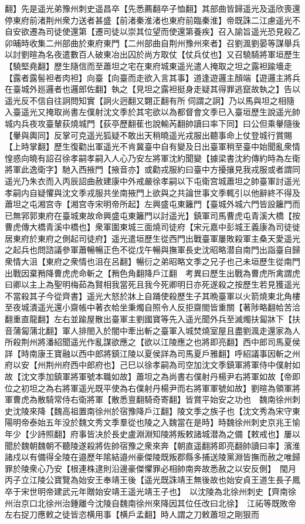 翻】先是遥光弟豫州刺史遥昌卒【先悉薦翻卒子恤翻】其部曲皆歸遥光及遥欣喪還停東府前渚荆州衆力送者甚盛【前渚秦淮渚也東府前臨秦淮】帝既誅二江慮遥光不自安欲遷為司徒使還第【遷司徒以崇其位望而使還第養疾】召入諭旨遥光恐見殺乙卯晡時收集二州部曲於東府東門【二州部曲自荆州豫州來者】召劉渢劉晏等謀舉兵以討劉暄為名夜遣數百人破東冶出囚於尚方取仗【仗兵仗也】又召驍騎將軍垣歷生【驍堅堯翻】歷生隨信而至蕭坦之宅在東府城東遥光遣人掩取之坦之露袒踰墻走【露者露髻袒者肉袒】向臺【向臺而走欲入言其事】道逢遊邏主顏端【遊邏主將兵在臺城外廵邏者也邏郎佐翻】執之【見坦之露袒挺身走疑其得罪逃竄故執之】告以遥光反不信自往詗問知實【詗火迥翻又翾正翻有所伺謂之詗】乃以馬與坦之相隨入臺遥光又掩取尚書左僕射沈文季於其宅欲以為都督會文季已入臺垣歷生說遥光帥城内兵夜攻臺輦荻燒城門【荻亭歷翻萑也說輸芮翻帥讀曰率下同】曰公但乘轝隨後【轝與輿同】反掌可克遥光狐疑不敢出天稍曉遥光戎服出聽事命上仗登城行賞賜【上時掌翻】歷生復勸出軍遥光不肯冀臺中自有變及日出臺軍稍至臺中始聞亂衆情惶惑向曉有詔召徐孝嗣孝嗣入人心乃安左將軍沈約聞變【據梁書沈約傳約時為左衛將軍此逸衛字】馳入西掖門【掖音亦】或勸戎服約曰臺中方擾攘見我戎服或者謂同遥光乃朱衣而入丙辰詔曲赦建康中外戒嚴徐孝嗣以下屯衛宫城蕭坦之帥臺軍討遥光孝嗣内自疑懼與沈文季戎服共坐南掖門上欲與之共論世事文季輒引以他辭終不得及蕭坦之屯湘宫寺【湘宫寺宋明帝所起】左興盛屯東籬門【臺城外城六門皆設籬門而已無郛郭東府在臺城東故命興盛屯東籬門以討遥光】鎮軍司馬曹虎屯青溪大橋【按曹虎傳大橋青溪中橋也】衆軍圍東城三面燒司徒府【宋元嘉中彭城王義康為司徒徙居東府於東府之側起司徒府】遥光遣垣歷生從西門出戰臺軍屢敗殺軍主桑天愛遥光之起兵也問諮議參軍蕭暢暢正色不從戊午暢與撫軍長史沈昭略潜自南門出詣臺自歸衆情大沮【東府之衆情也沮在呂翻】暢衍之弟昭略文季之兄子也己未垣歷生從南門出戰因棄矟降曹虎虎命斬之【矟色角翻降戶江翻　考異曰歷生出戰為曹虎所禽謂虎曰卿以主上為聖明梅茹為賢相我當死且我今死卿明日亦死遂殺之按歷生若見獲遥光不當殺其子今從齊書】遥光大怒於牀上自踊使殺歷生子其晩臺軍以火箭燒東北角樓至夜城潰遥光還小齋帳中著衣帢坐秉燭自照令人反拒齋閤皆重關【著陟略翻帢苦洽翻重直龍翻】左右並踰屋散出臺軍主劉國寶等先入遥光聞外兵至滅燭扶匐牀下【扶音蒲匐蒲北翻】軍人排閤入於闇中牽出斬之臺軍入城焚燒室屋且盡劉渢走還家為人所殺荆州將潘紹聞遥光作亂謀欲應之【欲以江陵應之也將即亮翻】西中郎司馬夏侯詳【時南康王寶融以西中郎將鎮江陵以夏侯詳為司馬夏戶雅翻】呼紹議事因斬之州府以安【州荆州府西中郎府也】己巳以徐孝嗣為司空加沈文季鎮軍將軍侍中僕射如故【沈文季加鎮軍將軍號本職如故】蕭坦之為尚書右僕射丹楊尹右將軍如故【帝即位之初坦之為右將軍遥光既平使為右僕射丹楊尹而右將軍軍號如故】劉暄為領軍將軍曹虎為散騎常侍右衛將軍【散悉亶翻騎奇寄翻】皆賞平始安之功也　魏南徐州刺史沈陵來降【魏高祖置南徐州於宿豫降戶江翻】陵文季之族子也【沈文秀為宋守東陽明帝泰始五年没於魏文秀文季羣從也陵之入魏當在是時】時魏徐州刺史京兆王愉年少【少詩照翻】府事皆决於長史盧淵淵知陵將叛敕諸城潜為之備【敕戒也】屢以聞於魏朝魏朝不聽陵遂殺將佐帥宿豫之衆來奔【朝直遥翻將即亮翻帥讀曰率】濱淮諸戍以有備得全陵在邉歷年隂結邉州豪傑陵既叛郡縣多捕送陵黨淵皆撫而赦之唯歸罪於陵衆心乃安【根連株逮則沿邊豪傑懼罪必相帥南奔故悉赦之以安反側】　閠月丙子立江陵公寶覽為始安王奉靖王後【遥光既誅靖王無後故也始安貞王道生長子鳳卒于宋世明帝建武元年贈始安靖王遥光靖王子也】　以沈陵為北徐州刺史【齊南徐州治京口北徐州治鍾離今沈陵自魏南徐州來降因其位任改曰北徐】　江祏等既敗帝左右捉刀應敕之徒皆恣横用事【横戶孟翻】時人謂之刀敕蕭坦之剛狠而